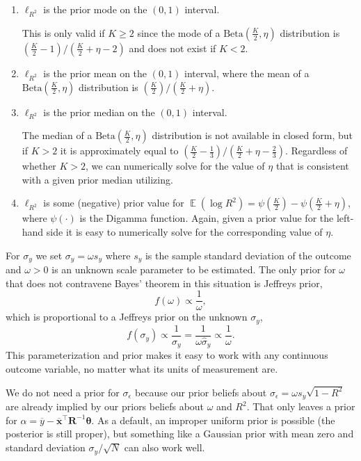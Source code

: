 \documentclass[11pt]{article}
\DeclareMathOperator{\E}{\mathbb{E}}
\begin{document}
\begin{enumerate}
\item $\ell_{R^2}$ is the prior mode on the $\left(0,1\right)$ interval.

This is only valid if $K \geq 2$ since the mode of a
$\mathrm{Beta}\left(\frac{K}{2},\eta\right)$ distribution is
$\left(\frac{K}{2} - 1\right) / \left(\frac{K}{2} + \eta - 2\right)$
and does not exist if $K < 2$.

\item $\ell_{R^2}$ is the prior mean on the $\left(0,1\right)$ interval, where
the mean of a $\mathrm{Beta}\left(\frac{K}{2}, \eta\right)$ distribution is
$\left(\frac{K}{2}\right) / \left(\frac{K}{2} + \eta\right)$.


\item $\ell_{R^2}$ is the prior median on the $\left(0,1\right)$ interval.

The median of a $\mathrm{Beta}\left(\frac{K}{2},\eta\right)$ distribution is not
available in closed form, but if $K > 2$ it is approximately equal to
$\left(\frac{K}{2} - \frac{1}{3}\right) / \left(\frac{K}{2} +
\eta - \frac{2}{3}\right)$.
Regardless of whether $K > 2$, we can numerically solve for the value of $\eta$
that is consistent with a given prior median utilizing.

\item $\ell_{R^2}$ is some (negative) prior value for
$\E\left(\log R^2\right) = \psi\left(\frac{K}{2}\right) -
\psi\left(\frac{K}{2}+\eta\right)$,
where $\psi\left(\cdot\right)$ is the Digamma function. Again, given a prior
value for the left-hand side it is easy to numerically solve for the
corresponding value of $\eta$.
\end{enumerate}


For $\sigma_y$ we set $\sigma_y = \omega s_y$ where $s_y$ is the sample standard
deviation of the outcome and $\omega > 0$ is an unknown scale parameter to be
estimated. The only prior for $\omega$ that does not contravene Bayes' theorem
in this situation is Jeffreys prior,
$$f\left(\omega\right) \propto \frac{1}{\omega},$$
which is proportional to a Jeffreys prior on the unknown $\sigma_y$,
$$f\left(\sigma_y\right) \propto \frac{1}{\sigma_y}
= \frac{1}{\omega \widehat{\sigma}_y} \propto \frac{1}{\omega}.$$
This parameterization and prior makes it easy to work with any continuous
outcome variable, no matter what its units of measurement are.

We do not need a prior for $\sigma_{\epsilon}$ because our prior beliefs about
$\sigma_{\epsilon} = \omega s_y \sqrt{1 - R^2}$ are already implied by our
priors beliefs about $\omega$ and $R^2$. That only leaves a prior for
$\alpha =
\overline{y} - \overline{\mathbf{x}}^\top \mathbf{R}^{-1} \boldsymbol{\theta}$.
As a default, an improper uniform prior is possible (the posterior is still
proper), but something like a Gaussian prior with mean zero and standard
deviation $\sigma_y / \sqrt{N}$ can also work well.
\end{document}

